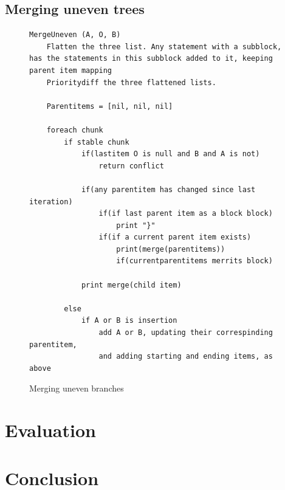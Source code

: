 \documentclass[11pt]{article}
\begin{document}
\subsection{Merging uneven trees}

\begin{figure}
  \caption{Merging uneven branches}
  \label{MergeToken}
\begin{verbatim}
MergeUneven (A, O, B)
    Flatten the three list. Any statement with a subblock, has the statements in this subblock added to it, keeping parent item mapping
    Prioritydiff the three flattened lists.

    Parentitems = [nil, nil, nil]

    foreach chunk
        if stable chunk
            if(lastitem O is null and B and A is not)
                return conflict

            if(any parentitem has changed since last iteration)
                if(if last parent item as a block block)
                    print "}"
                if(if a current parent item exists)
                    print(merge(parentitems))
                    if(currentparentitems merrits block)
            
            print merge(child item)

        else 
            if A or B is insertion
                add A or B, updating their correspinding parentitem,
                and adding starting and ending items, as above
\end{verbatim}
\end{figure}


\clearpage
\section{Evaluation}

\clearpage
\section{Conclusion}

\clearpage



\end{document}
